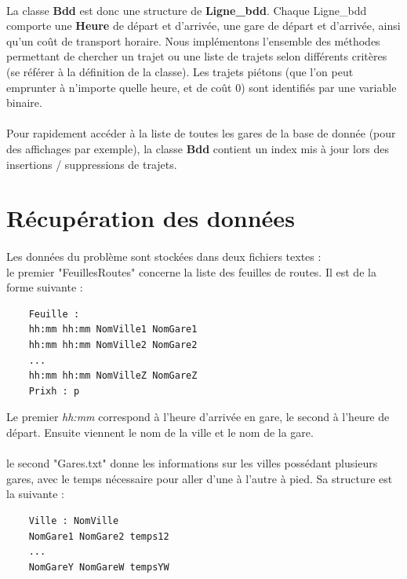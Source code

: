 \documentclass[a4paper,10pt,twoside]{report}
\begin{document}
    \paragraph{}La classe \textbf{Bdd} est donc une structure de \textbf{Ligne\_bdd}. Chaque Ligne\_bdd comporte une \textbf{Heure} de départ et d'arrivée, une gare de départ et d'arrivée, ainsi qu'un coût de transport horaire. Nous implémentons l'ensemble des méthodes permettant de chercher un trajet ou une liste de trajets selon différents critères (se référer à la définition de la classe). Les trajets piétons (que l'on peut emprunter à n'importe quelle heure, et de coût 0) sont identifiés par une variable binaire.
    
    \paragraph{}Pour rapidement accéder à la liste de toutes les gares de la base de donnée (pour des affichages par exemple), la classe \textbf{Bdd} contient un index mis à jour lors des insertions / suppressions de trajets.
        \newpage
    \section{Récupération des données}
    
    \paragraph{}Les données du problème sont stockées dans deux fichiers textes : \\
    le premier "FeuillesRoutes" concerne la liste des feuilles de routes. Il est de la forme suivante :
    \begin{verbatim}
    Feuille :
    hh:mm hh:mm NomVille1 NomGare1
    hh:mm hh:mm NomVille2 NomGare2
    ...
    hh:mm hh:mm NomVilleZ NomGareZ
    Prixh : p
    \end{verbatim}
    Le premier \textit{hh:mm} correspond à l'heure d'arrivée en gare, le second à l'heure de départ. Ensuite viennent le nom de la ville et le nom de la gare.\\
    
    \paragraph{}le second "Gares.txt" donne les informations sur les villes possédant plusieurs gares, avec le temps nécessaire pour aller d'une à l'autre à pied. Sa structure est la suivante :
    \begin{verbatim}
    Ville : NomVille
    NomGare1 NomGare2 temps12
    ...
    NomGareY NomGareW tempsYW
    \end{verbatim}
    
\end{document}

